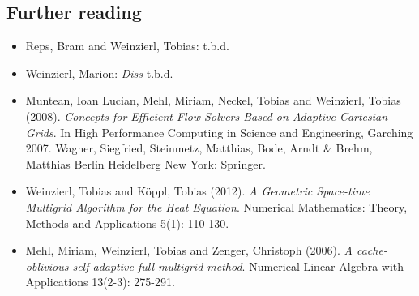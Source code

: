 \subsection*{Further reading}

\begin{itemize}
  \item  Reps, Bram and Weinzierl, Tobias: t.b.d.
  \item Weinzierl, Marion: {\em Diss} t.b.d.
  \item   Muntean, Ioan Lucian, Mehl, Miriam, Neckel, Tobias and Weinzierl,
  Tobias (2008). {\em Concepts for Efficient Flow Solvers Based on Adaptive
  Cartesian Grids}. In High Performance Computing in Science and Engineering, Garching 2007. Wagner, Siegfried, Steinmetz, Matthias, Bode, Arndt & Brehm, Matthias Berlin Heidelberg New York: Springer.
  \item Weinzierl, Tobias and K\"oppl, Tobias (2012). {\em A Geometric
  Space-time Multigrid Algorithm for the Heat Equation}. Numerical Mathematics:
  Theory, Methods and Applications 5(1): 110-130.
  \item Mehl, Miriam, Weinzierl, Tobias and Zenger, Christoph (2006). {\em A
  cache-oblivious self-adaptive full multigrid method}. Numerical Linear Algebra
  with Applications 13(2-3): 275-291.
\end{itemize}
